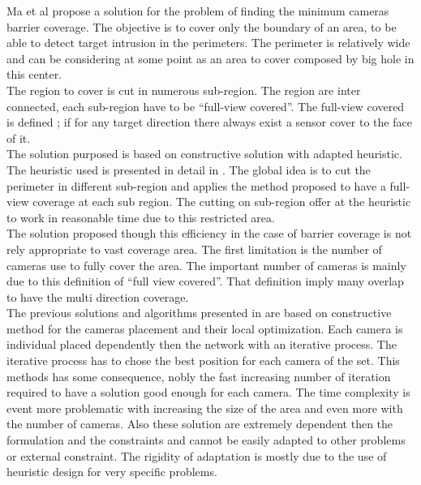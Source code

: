 Ma et al \cite{37*ma2012} propose a solution for the problem of finding the minimum cameras barrier coverage. The objective is to cover only the boundary of an area, to be able to detect target intrusion in the perimeters. The perimeter is relatively wide and can be considering at some point as an area to cover composed by big hole in this center.\\
 The region to cover is cut in numerous sub-region. The region are inter connected, each sub-region have to be “full-view covered”. The full-view covered is defined ; if for any target direction there always exist a sensor cover to the face of it.\\
The solution purposed is based on constructive solution with adapted heuristic. The heuristic used is presented in detail in \cite{37*ma2012}. The global idea is to cut the perimeter in different sub-region and applies the method proposed to have a full-view coverage at each sub region. 
The cutting on sub-region offer at the heuristic to work in reasonable time due to this restricted area.\\
The solution proposed though this efficiency in the case of barrier coverage is not rely appropriate to vast coverage area. The first limitation is the number of cameras use to fully cover the area. The important number of cameras is mainly due to this definition of “full view covered”. That definition imply many overlap to have the multi direction coverage.\\

The previous solutions and algorithms presented in \cite{38*liu2010 37*ma2012,81*nikolaidis2009,171*horster2006} are based on constructive method for the cameras placement and their local optimization. Each camera is individual placed dependently then the network with an iterative process. The iterative process has to chose the best position for each camera of the set. This methods has some consequence, nobly the fast increasing number of iteration required to have a solution good enough for each camera. The time complexity is event more problematic with increasing the size of the area and even more with the number of cameras. Also these solution are extremely dependent then the formulation and the constraints and cannot be easily adapted to other problems or external constraint. The rigidity of adaptation is mostly due to the  use of heuristic  design for  very specific problems. 

